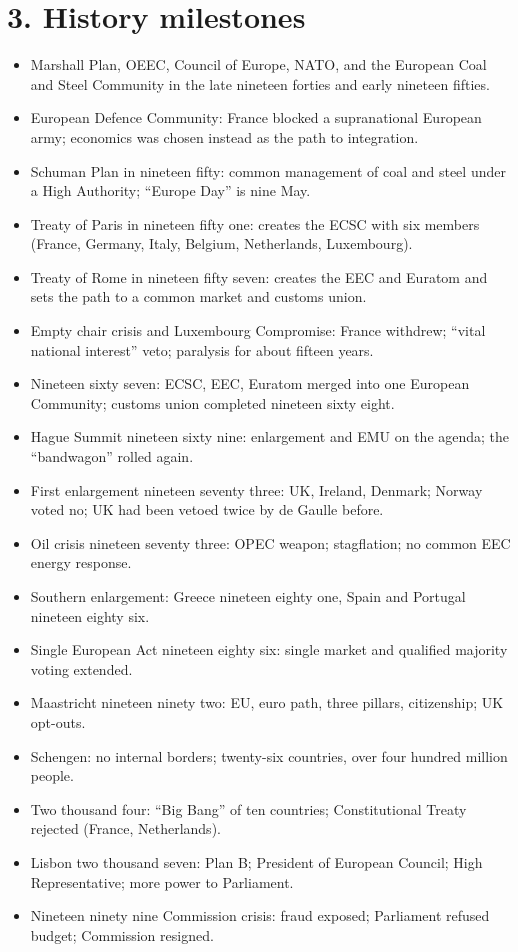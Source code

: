 \documentclass[10pt,a4paper]{article}
\begin{document}
\section*{3. History milestones}
\begin{itemize}
\item Marshall Plan, OEEC, Council of Europe, NATO, and the European Coal and Steel Community in the late nineteen forties and early nineteen fifties.
\item European Defence Community: France blocked a supranational European army; economics was chosen instead as the path to integration.
\item Schuman Plan in nineteen fifty: common management of coal and steel under a High Authority; ``Europe Day'' is nine May.
\item Treaty of Paris in nineteen fifty one: creates the ECSC with six members (France, Germany, Italy, Belgium, Netherlands, Luxembourg).
\item Treaty of Rome in nineteen fifty seven: creates the EEC and Euratom and sets the path to a common market and customs union.
\item Empty chair crisis and Luxembourg Compromise: France withdrew; ``vital national interest'' veto; paralysis for about fifteen years.
\item Nineteen sixty seven: ECSC, EEC, Euratom merged into one European Community; customs union completed nineteen sixty eight.
\item Hague Summit nineteen sixty nine: enlargement and EMU on the agenda; the ``bandwagon'' rolled again.
\item First enlargement nineteen seventy three: UK, Ireland, Denmark; Norway voted no; UK had been vetoed twice by de Gaulle before.
\item Oil crisis nineteen seventy three: OPEC weapon; stagflation; no common EEC energy response.
\item Southern enlargement: Greece nineteen eighty one, Spain and Portugal nineteen eighty six.
\item Single European Act nineteen eighty six: single market and qualified majority voting extended.
\item Maastricht nineteen ninety two: EU, euro path, three pillars, citizenship; UK opt-outs.
\item Schengen: no internal borders; twenty-six countries, over four hundred million people.
\item Two thousand four: ``Big Bang'' of ten countries; Constitutional Treaty rejected (France, Netherlands).
\item Lisbon two thousand seven: Plan B; President of European Council; High Representative; more power to Parliament.
\item Nineteen ninety nine Commission crisis: fraud exposed; Parliament refused budget; Commission resigned.
\end{itemize}
\end{document}
